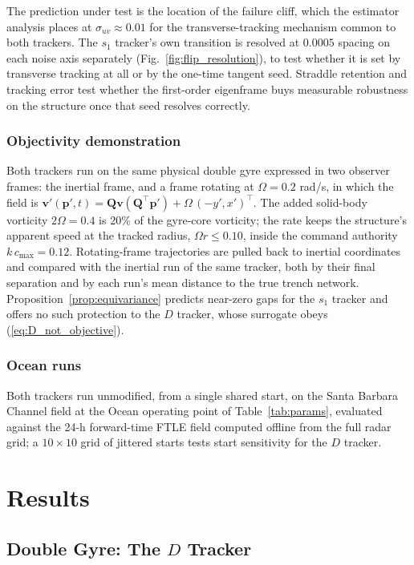 \documentclass[lettersize,journal]{IEEEtran}
\begin{document}
The prediction under test is the location of the failure cliff, which
the estimator analysis places at $\sigma_{uv} \approx 0.01$ for the
transverse-tracking mechanism common to both trackers. The $s_1$
tracker's own transition is resolved at $0.0005$ spacing on each noise
axis separately (Fig.~\ref{fig:flip_resolution}), to test whether it is
set by transverse tracking at all or by the one-time tangent seed.
Straddle retention and tracking error test whether the first-order
eigenframe buys measurable robustness on the structure once that seed
resolves correctly.

\subsubsection{Objectivity demonstration}
Both trackers run on the same physical double gyre expressed in two
observer frames: the inertial frame, and a frame rotating at
$\Omega = 0.2$ rad/s, in which the field is
$\mathbf{v}'(\mathbf{p}', t) = \mathbf{Q}\mathbf{v}(\mathbf{Q}^\top
\mathbf{p}') + \Omega\,(-y', x')^\top$. The added solid-body vorticity
$2\Omega = 0.4$ is 20\% of the gyre-core vorticity; the rate keeps the
structure's apparent speed at the tracked radius, $\Omega r \leq 0.10$,
inside the command authority $k\,c_{\max} = 0.12$. Rotating-frame
trajectories are pulled back to inertial coordinates and compared with
the inertial run of the same tracker, both by their final separation and
by each run's mean distance to the true trench network.
Proposition~\ref{prop:equivariance} predicts near-zero gaps for the
$s_1$ tracker and offers no such protection to the $D$ tracker, whose
surrogate obeys (\ref{eq:D_not_objective}).

\subsubsection{Ocean runs}
Both trackers run unmodified, from a single shared start, on the Santa
Barbara Channel field at the Ocean operating point of
Table~\ref{tab:params}, evaluated against the 24-h forward-time FTLE
field computed offline from the full radar grid; a $10 \times 10$ grid
of jittered starts tests start sensitivity for the $D$ tracker.

\section{Results}
\label{sec:results}

\subsection{Double Gyre: The $D$ Tracker}
\label{sec:results_sep}
\end{document}
